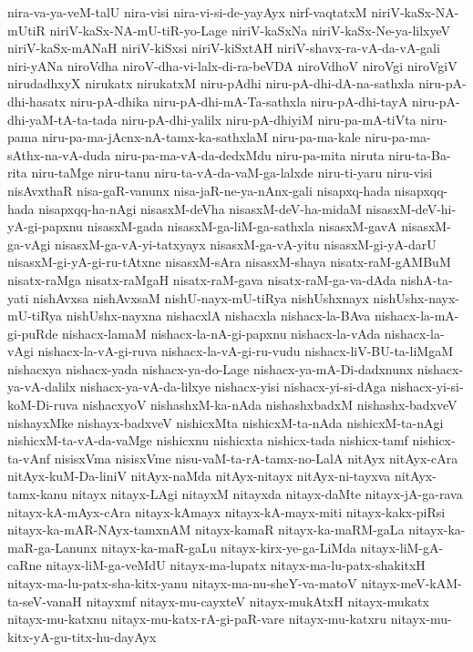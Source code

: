 {nira-va-ya-veM-talU
nira-visi
nira-vi-si-de-yayAyx
nirf-vaqtatxM
niriV-kaSx-NA-mUtiR
niriV-kaSx-NA-mU-tiR-yo-Lage
niriV-kaSxNa
niriV-kaSx-Ne-ya-lilxyeV
niriV-kaSx-mANaH
niriV-kiSxsi
niriV-kiSxtAH
niriV-shavx-ra-vA-da-vA-gali
niri-yANa
niroVdha
niroV-dha-vi-lalx-di-ra-beVDA
niroVdhoV
niroVgi
niroVgiV
nirudadhxyX
nirukatx
nirukatxM
niru-pAdhi
niru-pA-dhi-dA-na-sathxla
niru-pA-dhi-hasatx
niru-pA-dhika
niru-pA-dhi-mA-Ta-sathxla
niru-pA-dhi-tayA
niru-pA-dhi-yaM-tA-ta-tada
niru-pA-dhi-yalilx
niru-pA-dhiyiM
niru-pa-mA-tiVta
niru-pama
niru-pa-ma-jAcnx-nA-tamx-ka-sathxlaM
niru-pa-ma-kale
niru-pa-ma-sAthx-na-vA-duda
niru-pa-ma-vA-da-dedxMdu
niru-pa-mita
niruta
niru-ta-Ba-rita
niru-taMge
niru-tanu
niru-ta-vA-da-vaM-ga-lalxde
niru-ti-yaru
niru-visi
nisAvxthaR
nisa-gaR-vanunx
nisa-jaR-ne-ya-nAnx-gali
nisapxq-hada
nisapxqq-hada
nisapxqq-ha-nAgi
nisasxM-deVha
nisasxM-deV-ha-midaM
nisasxM-deV-hi-yA-gi-papxnu
nisasxM-gada
nisasxM-ga-liM-ga-sathxla
nisasxM-gavA
nisasxM-ga-vAgi
nisasxM-ga-vA-yi-tatxyayx
nisasxM-ga-vA-yitu
nisasxM-gi-yA-darU
nisasxM-gi-yA-gi-ru-tAtxne
nisasxM-sAra
nisasxM-shaya
nisatx-raM-gAMBuM
nisatx-raMga
nisatx-raMgaH
nisatx-raM-gava
nisatx-raM-ga-va-dAda
nishA-ta-yati
nishAvxsa
nishAvxsaM
nishU-nayx-mU-tiRya
nishUshxnayx
nishUshx-nayx-mU-tiRya
nishUshx-nayxna
nishacxlA
nishacxla
nishacx-la-BAva
nishacx-la-mA-gi-puRde
nishacx-lamaM
nishacx-la-nA-gi-papxnu
nishacx-la-vAda
nishacx-la-vAgi
nishacx-la-vA-gi-ruva
nishacx-la-vA-gi-ru-vudu
nishacx-liV-BU-ta-liMgaM
nishacxya
nishacx-yada
nishacx-ya-do-Lage
nishacx-ya-mA-Di-dadxnunx
nishacx-ya-vA-dalilx
nishacx-ya-vA-da-lilxye
nishacx-yisi
nishacx-yi-si-dAga
nishacx-yi-si-koM-Di-ruva
nishacxyoV
nishashxM-ka-nAda
nishashxbadxM
nishashx-badxveV
nishayxMke
nishayx-badxveV
nishicxMta
nishicxM-ta-nAda
nishicxM-ta-nAgi
nishicxM-ta-vA-da-vaMge
nishicxnu
nishicxta
nishicx-tada
nishicx-tamf
nishicx-ta-vAnf
nisisxVma
nisisxVme
nisu-vaM-ta-rA-tamx-no-LalA
nitAyx
nitAyx-cAra
nitAyx-kuM-Da-liniV
nitAyx-naMda
nitAyx-nitayx
nitAyx-ni-tayxva
nitAyx-tamx-kanu
nitayx
nitayx-LAgi
nitayxM
nitayxda
nitayx-daMte
nitayx-jA-ga-rava
nitayx-kA-mAyx-cAra
nitayx-kAmayx
nitayx-kA-mayx-miti
nitayx-kakx-piRsi
nitayx-ka-mAR-NAyx-tamxnAM
nitayx-kamaR
nitayx-ka-maRM-gaLa
nitayx-ka-maR-ga-Lanunx
nitayx-ka-maR-gaLu
nitayx-kirx-ye-ga-LiMda
nitayx-liM-gA-caRne
nitayx-liM-ga-veMdU
nitayx-ma-lupatx
nitayx-ma-lu-patx-shakitxH
nitayx-ma-lu-patx-sha-kitx-yanu
nitayx-ma-nu-sheY-va-matoV
nitayx-meV-kAM-ta-seV-vanaH
nitayxmf
nitayx-mu-cayxteV
nitayx-mukAtxH
nitayx-mukatx
nitayx-mu-katxnu
nitayx-mu-katx-rA-gi-paR-vare
nitayx-mu-katxru
nitayx-mu-kitx-yA-gu-titx-hu-dayAyx
}
